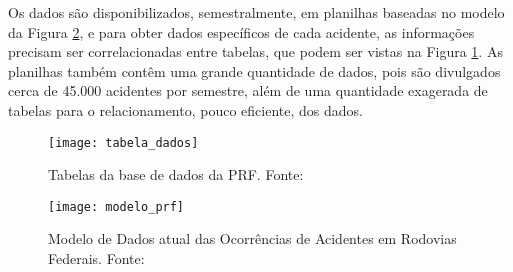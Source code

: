 
Os dados são disponibilizados, semestralmente, em planilhas baseadas no modelo da
Figura \ref{fig:modelo_prf}, e para obter dados específicos de cada acidente, as informações precisam ser
correlacionadas entre tabelas, que podem ser vistas na Figura \ref{fig:tabela_dados}. As planilhas também contêm
uma grande quantidade de dados, pois são divulgados cerca de 45.000 acidentes por semestre,
além de uma quantidade exagerada de tabelas para o relacionamento, pouco eficiente, dos
dados.

\begin{figure}[!htb]
 \centering
 \texttt{[image: tabela\_dados]}
 \caption[Tabelas da base de dados da PRF]{Tabelas da base de dados da PRF. Fonte: \cite{brasil13}}
 \label{fig:tabela_dados}
\end{figure}

\begin{figure}[!htb]
 \centering
 \texttt{[image: modelo\_prf]}
 \caption[Modelo de Dados atual das Ocorrências de Acidentes em Rodovias Federais]
  {Modelo de Dados atual das Ocorrências de Acidentes em Rodovias Federais. Fonte: \cite{brasil13}}
 \label{fig:modelo_prf}
\end{figure}